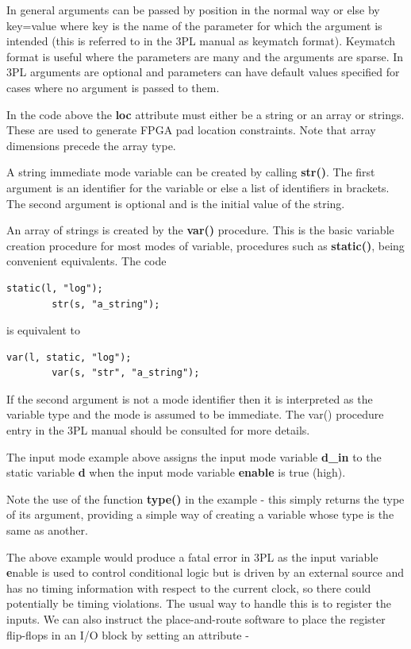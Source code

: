 \documentclass[10pt,a4paper,twoside,fleqn]{article}
\newcommand{\kwd}[1]{{\bf #1}} %
\newcommand{\var}[1]{{\bf #1}} %
\begin{document}
    In general arguments can be passed by position in the normal way or else by
    key=value where key is the name of the parameter for which the argument is
    intended (this is referred to in the 3PL manual as keymatch format). Keymatch
    format is useful where the parameters are many and the arguments are sparse.
    In 3PL arguments are optional and parameters can have default values specified
    for cases where no argument is passed to them.
    
    In the code above the \var{loc} attribute must either be a string or an array or
    strings. These are used to generate FPGA pad location constraints.
    Note that array dimensions precede the array type.
    
    A string immediate mode variable can be created by calling \kwd{str()}.
    The first argument is an identifier for the variable or else a list of
    identifiers in brackets. The second argument is optional and is the initial
    value of the string.
    
    An array of strings is created by the \kwd{var()} procedure. This is the basic
    variable creation procedure for most modes of variable, procedures such
    as \kwd{static()}, being convenient equivalents. The code
    \begin{lstlisting}[language=threepl]
        static(l, "log");
        str(s, "a_string");
    \end{lstlisting}
    is equivalent to
    \begin{lstlisting}[language=threepl]
        var(l, static, "log");
        var(s, "str", "a_string");
    \end{lstlisting}
    If the second argument is not a mode identifier then it is interpreted as the
    variable type and the mode is assumed to be immediate. The var() procedure entry in
    the 3PL manual should be consulted for more details.   
    
    The input mode example above assigns the input mode variable \var{d\_in} to
    the static variable \var{d} when the input mode variable \var{enable} is true
    (high).
    
    Note the use of the function {\bf type()} in the example - this simply returns the
    type of its argument, providing a simple way of creating a variable whose type
    is the same as another.
    
    The above example would produce a fatal error in 3PL as the input variable {\var
    enable} is used to control conditional logic but is driven by an external
    source and has no timing information with respect to the current clock, so
    there could potentially be timing violations. The usual way to handle this
    is to register the inputs. We can also instruct the place-and-route
    software to place the register flip-flops in an I/O block by setting
    an attribute -
\end{document}
